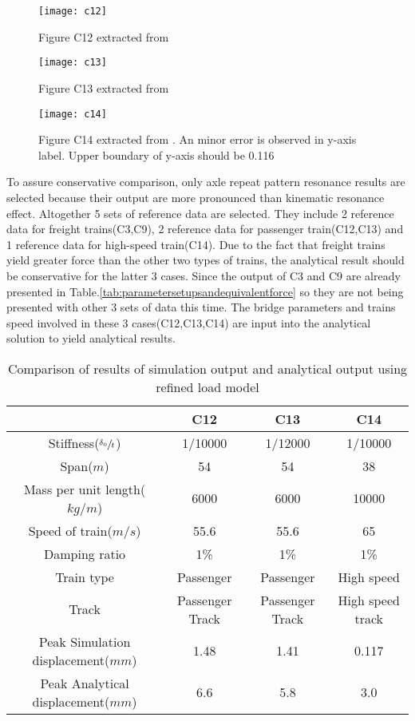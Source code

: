 \begin{figure}[h!]
    \centering
    \texttt{[image: c12]}
    \caption{Figure C12 extracted from \citet{d181dt329} }
    \label{fig:c12}
\end{figure}

\begin{figure}[h!]
    \centering
    \texttt{[image: c13]}
    \caption{Figure C13 extracted from \citet{d181dt329} }
    \label{fig:c13}
\end{figure}

\begin{figure}[h!]
    \centering
    \texttt{[image: c14]}
    \caption{Figure C14 extracted from \citet{d181dt329}. An minor error is observed in y-axis label. Upper boundary of y-axis should be 0.116 }
    \label{fig:c14}
\end{figure}

To assure conservative comparison, only axle repeat pattern resonance results are selected because their output are more pronounced than kinematic resonance effect. Altogether 5 sets of reference data are selected. They include 2 reference data for freight trains(C3,C9), 2 reference data for passenger train(C12,C13) and 1 reference data for high-speed train(C14). Due to the fact that freight trains yield greater force than the other two types of trains, the analytical result should be conservative for the latter 3 cases. Since the output of C3 and C9 are already presented in Table.\ref{tab:parametersetupsandequivalentforce} so they are not being presented with other 3 sets of data this time. The bridge parameters and trains speed involved in these 3 cases(C12,C13,C14) are input into the analytical solution to yield analytical results.

\begin{table}[h!]
    \centering
    \caption{Comparison of results of simulation output and analytical output using refined load model}
    \begin{tabular}{c|ccc}
        \hline
         & C12 & C13 & C14\\
        \hline
        Stiffness($\sfrac{\delta_0}{t}$) & 1/10000 & 1/12000 & 1/10000\\
        Span($m$) & 54 & 54 & 38\\
        Mass per unit length($kg/m$) & 6000 & 6000 & 10000\\
        Speed of train($m/s$) & 55.6 & 55.6 & 65\\
        Damping ratio & 1\% & 1\% & 1\%\\
        Train type & Passenger & Passenger & High speed \\
        Track & Passenger Track & Passenger Track & High speed track\\
        \hline
        Peak Simulation displacement($mm$) & 1.48 & 1.41 & 0.117\\
        Peak Analytical displacement($mm$) & 6.6 & 5.8 & 3.0 \\
        \hline
    \end{tabular}
    \label{tab:comparisonresultssimulationanalytical}
\end{table}


